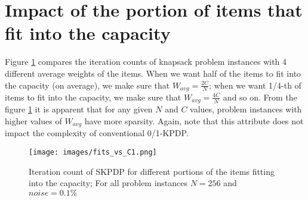 \section{Impact of the portion of items that fit into the capacity}
Figure \ref{fig:fits_vs_c1} compares the iteration counts of knapsack problem instances with 4 different average weights of the items. When we want half of the items to fit into the capacity (on average), we make sure that $W_{avg}=\frac{2C}{N}$; when we want 1/4-th of items to fit into the capacity, we make sure that $W_{avg}=\frac{4C}{N}$ and so on. From the figure \ref{fig:fits_vs_c1} it is apparent that for any given $N$ and $C$ values, problem instances with higher values of $W_{avg}$ have more sparsity. Again, note that this attribute does not impact the complexity of conventional 0/1-KPDP.


\begin{figure}[htbp]
\centerline{\texttt{[image: images/fits\_vs\_C1.png]}}
\caption{Iteration count of SKPDP for different portions of the items fitting into the capacity; For all problem instances $N = 256$ and $noise = 0.1\%$}
\label{fig:fits_vs_c1}
\end{figure}


